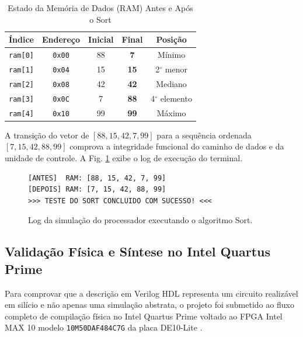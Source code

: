 \begin{table}[htbp]
\centering
\caption{Estado da Memória de Dados (RAM) Antes e Após o Sort}
\label{tab:ram_sort}
\scriptsize
\setlength{\tabcolsep}{4pt}
\begin{tabular}{ccccc}
\toprule
\textbf{Índice} & \textbf{Endereço} & \textbf{Inicial} & \textbf{Final} & \textbf{Posição} \\
\midrule
\texttt{ram[0]} & \texttt{0x00} & 88 & \textbf{7}  & Mínimo \\
\texttt{ram[1]} & \texttt{0x04} & 15 & \textbf{15} & 2$^\circ$ menor \\
\texttt{ram[2]} & \texttt{0x08} & 42 & \textbf{42} & Mediano \\
\texttt{ram[3]} & \texttt{0x0C} & 7  & \textbf{88} & 4$^\circ$ elemento \\
\texttt{ram[4]} & \texttt{0x10} & 99 & \textbf{99} & Máximo \\
\bottomrule
\end{tabular}
\end{table}

A transição do vetor de $[88, 15, 42, 7, 99]$ para a sequência ordenada $[7, 15, 42, 88, 99]$ comprova a integridade funcional do caminho de dados e da unidade de controle. A Fig. \ref{fig:top_output} exibe o log de execução do terminal.

\begin{figure}[htbp]
\centering
\begin{lstlisting}[style=estiloTerminal]
[ANTES]  RAM: [88, 15, 42, 7, 99]
[DEPOIS] RAM: [7, 15, 42, 88, 99]
>>> TESTE DO SORT CONCLUIDO COM SUCESSO! <<<
\end{lstlisting}
\caption{Log da simulação do processador executando o algoritmo Sort.}
\label{fig:top_output}
\end{figure}

\subsection{Validação Física e Síntese no Intel Quartus Prime}
Para comprovar que a descrição em Verilog HDL representa um circuito realizável em silício e não apenas uma simulação abstrata, o projeto foi submetido ao fluxo completo de compilação física no Intel Quartus Prime \cite{intel_quartus_handbook} voltado ao FPGA Intel MAX 10 modelo \texttt{10M50DAF484C7G} da placa DE10-Lite \cite{terasic_de10_lite_user_manual}.

